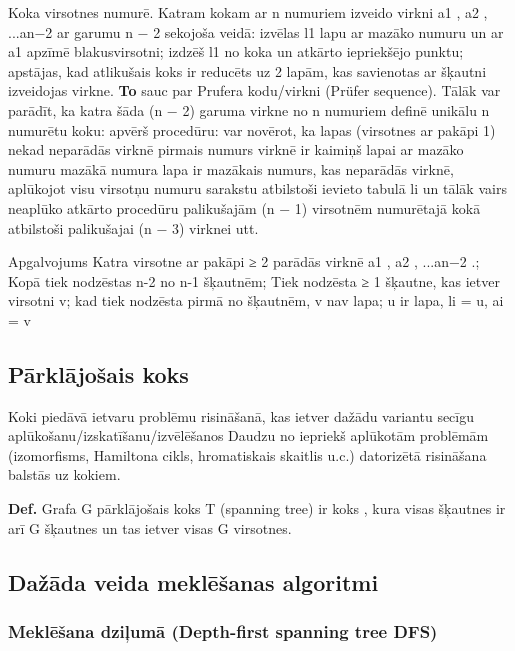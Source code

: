 \documentclass{article}
\begin{document}
Koka virsotnes numurē. Katram kokam ar n numuriem izveido virkni a1 , a2 , ...an−2 ar garumu n − 2 sekojoša veidā: izvēlas l1 lapu ar mazāko numuru un ar a1 apzīmē blakusvirsotni; izdzēš l1 no koka un atkārto iepriekšējo punktu; apstājas, kad atlikušais koks ir reducēts uz 2 lapām, kas savienotas ar šķautni izveidojas virkne. \textbf{To }sauc par Prufera kodu/virkni (Prüfer sequence).  Tālāk var parādīt, ka katra šāda (n − 2) garuma virkne no n numuriem definē unikālu n numurētu koku: apvērš procedūru: var novērot, ka lapas (virsotnes ar pakāpi 1) nekad neparādās virknē pirmais numurs virknē ir kaimiņš lapai ar mazāko numuru mazākā numura lapa ir mazākais numurs, kas neparādās virknē, aplūkojot visu virsotņu numuru sarakstu atbilstoši ievieto tabulā li un tālāk vairs neaplūko atkārto procedūru palikušajām (n − 1) virsotnēm numurētajā kokā atbilstoši palikušajai (n − 3) virknei utt.


Apgalvojums
Katra virsotne ar pakāpi ≥ 2 parādās virknē a1 , a2 , ...an−2 .;  Kopā tiek nodzēstas n-2 no n-1 šķautnēm; Tiek nodzēsta ≥ 1 šķautne, kas ietver virsotni v; kad tiek nodzēsta pirmā no šķautnēm, v nav lapa; u ir lapa, li = u, ai = v



\subsection{Pārklājošais koks}

Koki piedāvā ietvaru problēmu risināšanā, kas ietver dažādu variantu secīgu aplūkošanu/izskatīšanu/izvēlēšanos
Daudzu no iepriekš aplūkotām problēmām (izomorfisms, Hamiltona cikls, hromatiskais skaitlis u.c.) datorizētā risināšana balstās uz kokiem.


\textbf{Def.}  Grafa G pārklājošais koks T (spanning tree) ir koks , kura visas šķautnes ir arī G šķautnes un tas ietver visas G virsotnes.

\subsection{Dažāda veida meklēšanas algoritmi}

\subsubsection{Meklēšana dziļumā (Depth-first spanning tree DFS)}
\end{document}
